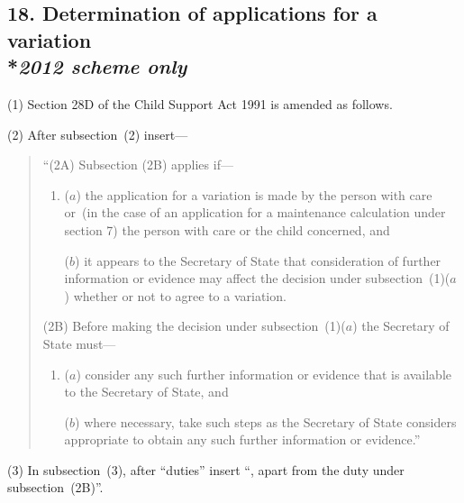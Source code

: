 \documentclass[12pt,a4paper]{article}
\begin{document}

\subsection[18. Determination of applications for a variation]{18. Determination of applications for a variation\\*\emph{2012 scheme only}}

(1) Section 28D of the Child Support Act 1991 is amended as follows.

(2) After subsection~(2) insert—
\begin{quotation}
“(2A) Subsection (2B) applies if—
\begin{enumerate}\item[]
($a$) the application for a variation is made by the person with care or~(in the case of an application for a maintenance calculation under section 7) the person with care or the child concerned, and

($b$) it appears to the Secretary of State that consideration of further information or evidence may affect the decision under subsection~(1)($a$) whether or not to agree to a variation.
\end{enumerate}

(2B) Before making the decision under subsection~(1)($a$) the Secretary of State must—
\begin{enumerate}\item[]
($a$) consider any such further information or evidence that is available to the Secretary of State, and

($b$) where necessary, take such steps as the Secretary of State considers appropriate to obtain any such further information or evidence.”
\end{enumerate}
\end{quotation}

(3) In subsection~(3), after “duties” insert “, apart from the duty under subsection~(2B)”.

\end{document}

